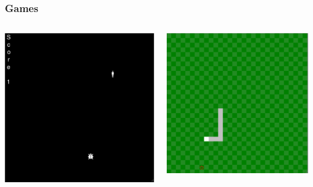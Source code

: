 \documentclass[aspectratio=169]{beamer}
\begin{document}
\begin{frame}
  \frametitle{Games}

  \begin{columns}
    \includegraphics[width=1.0\linewidth]{viz_figs/game-bugstomp.png}

    \includegraphics[width=1.0\linewidth]{viz_figs/game-snake.png}
    

\end{columns}
\end{frame}
\end{document}
